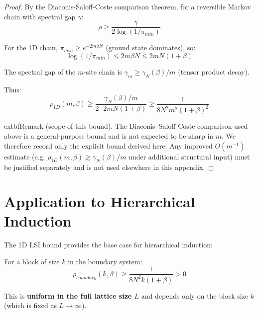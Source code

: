 \begin{proof}
By the Diaconis-Saloff-Coste comparison theorem, for a reversible Markov 
chain with spectral gap $\gamma$:
\begin{equation}
\rho \geq \frac{\gamma}{2\log(1/\pi_{min})}
\end{equation}

For the 1D chain, $\pi_{min} \geq e^{-2m\beta N}$ (ground state dominates), so:
\begin{equation}
\log(1/\pi_{min}) \leq 2m\beta N \leq 2mN(1+\beta)
\end{equation}

The spectral gap of the $m$-site chain is $\gamma_m \geq \gamma_N(\beta)/m$ 
(tensor product decay).

Thus:
\begin{equation}
\rho_{1D}(m, \beta) \geq \frac{\gamma_N(\beta)/m}{2 \cdot 2mN(1+\beta)} \geq \frac{1}{8N^2 m^2(1+\beta)^2}
\end{equation}

	extbf{Remark (scope of this bound).} The Diaconis--Saloff-Coste comparison used above is a
general-purpose bound and is not expected to be sharp in $m$. We therefore record only the
explicit bound derived here. Any improved $O(m^{-1})$ estimate (e.g.
$\rho_{1D}(m,\beta)\gtrsim \gamma_N(\beta)/m$ under additional structural input)
must be justified separately and is not used elsewhere in this appendix.
\end{proof}

\section{Application to Hierarchical Induction}

\begin{corollary}
\label{cor:base-case}
The 1D LSI bound provides the base case for hierarchical induction:

For a block of size $k$ in the boundary system:
\begin{equation}
\rho_{boundary}(k, \beta) \geq \frac{1}{8N^2 k(1+\beta)} > 0
\end{equation}

This is \textbf{uniform in the full lattice size $L$} and depends only on 
the block size $k$ (which is fixed as $L \to \infty$).
\end{corollary}

